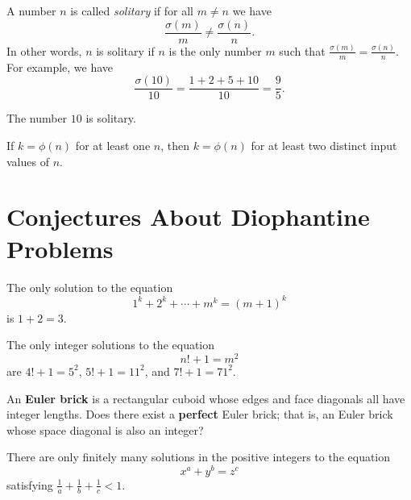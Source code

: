 A number $n$ is called \emph{solitary} if for all $m\neq n$ we have
\begin{equation*}
  \frac{\sigma(m)}{m}\neq \frac{\sigma(n)}{n}.
\end{equation*}
In other words, $n$ is solitary if $n$ is the only number $m$ such that $\frac{\sigma(m)}{m}=\frac{\sigma(n)}{n}$. For example, we have
\begin{equation*}
  \frac{\sigma(10)}{10}=\frac{1+2+5+10}{10}=\frac{9}{5}.
\end{equation*}

\begin{conjecture}
  The number $10$ is solitary.
\end{conjecture}

\begin{conjecture}
  If $k=\phi(n)$ for at least one $n$, then $k=\phi(n)$ for at least two distinct input values of $n$.
\end{conjecture}

\section{Conjectures About Diophantine Problems}

\begin{conjecture}
  The only solution to the equation
  \begin{equation*}
    1^k+2^k+\cdots + m^k=(m+1)^k
  \end{equation*}
  is $1+2=3$.
\end{conjecture}

\begin{conjecture}
  The only integer solutions to the equation
  \begin{equation*}
    n!+1=m^2
  \end{equation*}
  are $4!+1=5^2$, $5!+1=11^2$, and $7!+1=71^2$.
\end{conjecture}

\begin{problem}
  An \textbf{Euler brick} is a rectangular cuboid whose edges and face diagonals all have integer lengths. Does there exist a \textbf{perfect} Euler brick; that is, an Euler brick whose space diagonal is also an integer?
\end{problem}

\begin{conjecture}
  There are only finitely many solutions in the positive integers to the equation
  \begin{equation*}
    x^a+y^b=z^c
  \end{equation*}
  satisfying $\frac{1}{a}+\frac{1}{b}+\frac{1}{c}<1$.
\end{conjecture}


